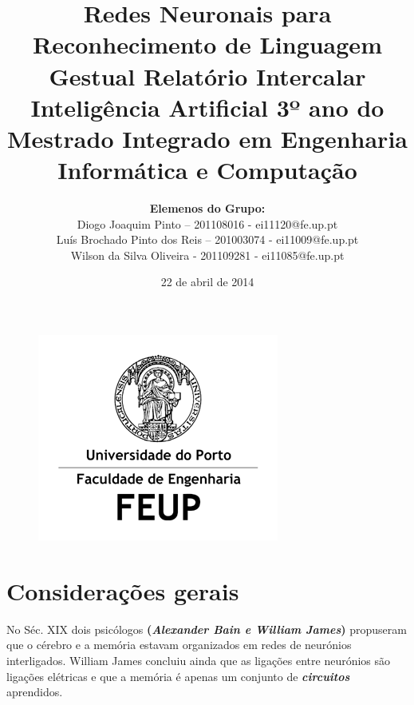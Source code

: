 \documentclass[10pt,a4paper]{article}
\begin{document}
\begin{figure}
\centering
\includegraphics[width=0.7\linewidth]{./LogoFeup}
\end{figure}

\title{\Huge\textbf{Redes Neuronais para Reconhecimento de Linguagem Gestual}\linebreak\linebreak\linebreak
\Large\textbf{Relatório Intercalar}\linebreak\linebreak
\Large{Inteligência Artificial}\linebreak
\Large{3º ano do Mestrado Integrado em Engenharia Informática e Computação} \linebreak \linebreak}

\author{\textbf{Elemenos do Grupo:}\\ Diogo Joaquim Pinto – 201108016 - ei11120@fe.up.pt \\ Luís Brochado Pinto dos Reis – 201003074 - ei11009@fe.up.pt \\ Wilson da Silva Oliveira - 201109281 - ei11085@fe.up.pt}
\date{22 de abril de 2014}
\maketitle

\tableofcontents
\newpage
\section{Considerações gerais}
No Séc. XIX dois psicólogos \textbf{(\textit{Alexander Bain e William James})} propuseram que o cérebro e a memória estavam organizados em redes de neurónios interligados. William James concluiu ainda que as ligações entre neurónios são ligações elétricas e que a memória é apenas um conjunto de \textbf{\textit{circuitos}} aprendidos.
\end{document}
